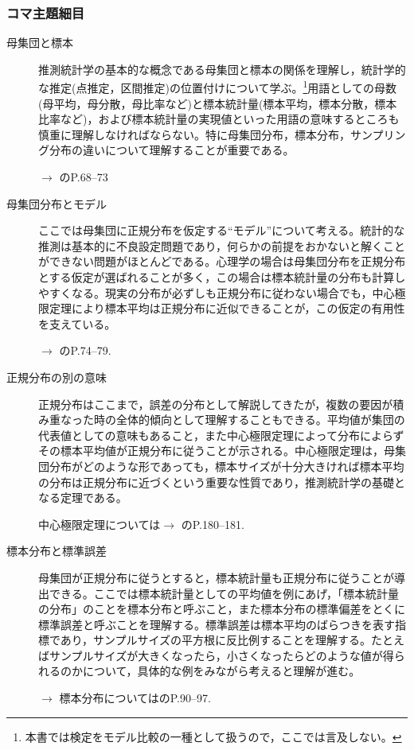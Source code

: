 \subsubsection{コマ主題細目}
\begin{description}
	\item[母集団と標本] 推測統計学の基本的な概念である母集団と標本の関係を理解し，統計学的な推定(点推定，区間推定)の位置付けについて学ぶ。\footnote{本書では検定をモデル比較の一種として扱うので，ここでは言及しない。}用語としての母数(母平均，母分散，母比率など)と標本統計量(標本平均，標本分散，標本比率など)，および標本統計量の実現値といった用語の意味するところも慎重に理解しなければならない。特に母集団分布，標本分布，サンプリング分布の違いについて理解することが重要である。
	      \begin{flushright}
		      $\to$ \textcite{Yamada2004}のP.68--73
	      \end{flushright}

	\item[母集団分布とモデル] ここでは母集団に正規分布を仮定する``モデル''について考える。統計的な推測は基本的に不良設定問題であり，何らかの前提をおかないと解くことができない問題がほとんどである。心理学の場合は母集団分布を正規分布とする仮定が選ばれることが多く，この場合は標本統計量の分布も計算しやすくなる。現実の分布が必ずしも正規分布に従わない場合でも，中心極限定理により標本平均は正規分布に近似できることが，この仮定の有用性を支えている。
	      \begin{flushright}
		      $\to$ \textcite{Yamada2004}のP.74--79.
	      \end{flushright}

	\item[正規分布の別の意味] 正規分布はここまで，誤差の分布として解説してきたが，複数の要因が積み重なった時の全体的傾向として理解することもできる。平均値が集団の代表値としての意味もあること，また中心極限定理によって分布によらずその標本平均値が正規分布に従うことが示される。中心極限定理は，母集団分布がどのような形であっても，標本サイズが十分大きければ標本平均の分布は正規分布に近づくという重要な性質であり，推測統計学の基礎となる定理である。
	      \begin{flushright}
		      中心極限定理については$\to$ \textcite{Minamoto2015}のP.180--181.
	      \end{flushright}

	\item[標本分布と標準誤差] 母集団が正規分布に従うとすると，標本統計量も正規分布に従うことが導出できる。ここでは標本統計量としての平均値を例にあげ，「標本統計量の分布」のことを標本分布と呼ぶこと，また標本分布の標準偏差をとくに標準誤差と呼ぶことを理解する。標準誤差は標本平均のばらつきを表す指標であり，サンプルサイズの平方根に反比例することを理解する。たとえばサンプルサイズが大きくなったら，小さくなったらどのような値が得られるのかについて，具体的な例をみながら考えると理解が進む。
	      \begin{flushright}
		      $\to$ 標本分布については\textcite{Yamada2004}のP.90--97.
	      \end{flushright}


\end{description}
